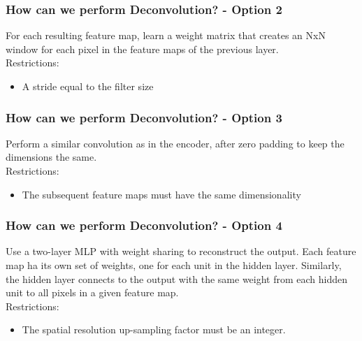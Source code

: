 \documentclass{beamer}
\begin{document}
\begin{frame}
\frametitle{How can we perform Deconvolution? - Option 2}
For each resulting feature map, learn a weight matrix that creates an NxN window for each pixel in the feature maps of the previous layer.\\ \vspace{2mm}
Restrictions:
\begin{itemize}
\item A stride equal to the filter size
\end{itemize} 
\end{frame}

\begin{frame}
\frametitle{How can we perform Deconvolution? - Option 3}
Perform a similar convolution as in the encoder, after zero padding to keep the dimensions the same.\\ \vspace{2mm}
Restrictions:
\begin{itemize}
\item The subsequent feature maps must have the same dimensionality
\end{itemize} 
\end{frame}

\begin{frame}
\frametitle{How can we perform Deconvolution? - Option 4}

Use a two-layer MLP with weight sharing to reconstruct the output. Each feature map ha its own set of weights, one for each unit in the hidden layer. Similarly, the hidden layer connects to the output with the same weight from each hidden unit to all pixels in a given feature map.
\\ \vspace{2mm}
Restrictions:
\begin{itemize}
\item The spatial resolution up-sampling factor must be an integer.
\end{itemize} 
\end{frame}
\end{document}
